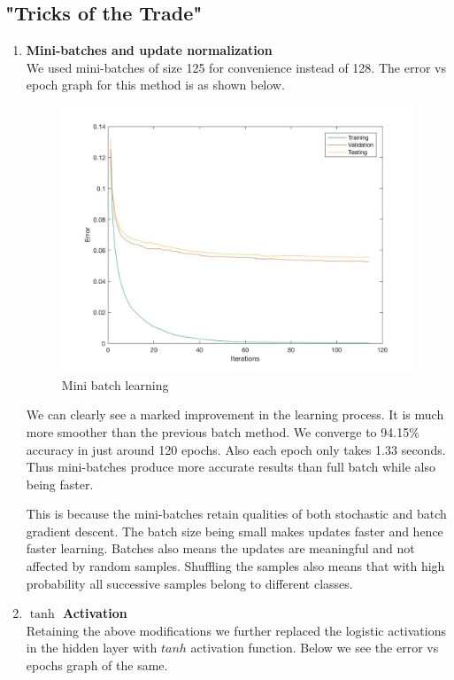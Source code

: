 \documentclass[11pt,twoside]{article}
\begin{document}
\subsection{"Tricks of the Trade"}
\begin{enumerate}[label=(\alph*)]

\item \textbf{Mini-batches and update normalization}\\
We used mini-batches of size 125 for convenience instead of 128. The error vs epoch graph for this method is as shown below.

\begin{figure}[H]
  \includegraphics[width=1\columnwidth]{minibatch}
  \centering
  \caption{Mini batch learning}
  \label{fig:4_a}
  \end{figure}
  
We can clearly see a marked improvement in the learning process. It is much more smoother than the previous batch method. We converge to 94.15\% accuracy in just around 120 epochs. Also each epoch only takes 1.33 seconds. Thus mini-batches produce more accurate results than full batch while also being faster.

This is because the mini-batches retain qualities of both stochastic and batch gradient descent. The batch size being small makes updates faster and hence faster learning. Batches also means the updates are meaningful and not affected by random samples. Shuffling the samples also means that with high probability all successive samples belong to different classes. 
  

\item \textbf{$\tanh$ Activation}\\
Retaining the above modifications we further replaced the logistic activations in the hidden layer with $tanh$ activation function. Below we see the error vs epochs graph of the same.


\end{enumerate}
\end{document}
